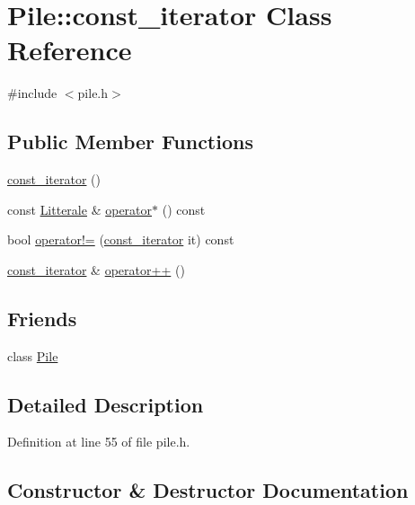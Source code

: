 \hypertarget{class_pile_1_1const__iterator}{}\section{Pile\+:\+:const\+\_\+iterator Class Reference}
\label{class_pile_1_1const__iterator}


{\ttfamily \#include $<$pile.\+h$>$}

\subsection*{Public Member Functions}
\begin{DoxyCompactItemize}
\item 
\hyperlink{class_pile_1_1const__iterator_a16b6388cc10e68859a1084e9ce50dbd6}{const\+\_\+iterator} ()
\item 
const \hyperlink{class_litterale}{Litterale} \& \hyperlink{class_pile_1_1const__iterator_a303c80d541bb110c9dc0ae0f0f1308ae}{operator$\ast$} () const 
\item 
bool \hyperlink{class_pile_1_1const__iterator_a0f202ce83d9776e19b84464b24d6d5f8}{operator!=} (\hyperlink{class_pile_1_1const__iterator}{const\+\_\+iterator} it) const 
\item 
\hyperlink{class_pile_1_1const__iterator}{const\+\_\+iterator} \& \hyperlink{class_pile_1_1const__iterator_a1aeccfde6065931eea320fa22f71eb01}{operator++} ()
\end{DoxyCompactItemize}
\subsection*{Friends}
\begin{DoxyCompactItemize}
\item 
class \hyperlink{class_pile_1_1const__iterator_a77806361379cf369e95d2b4346c7e28a}{Pile}
\end{DoxyCompactItemize}


\subsection{Detailed Description}


Definition at line 55 of file pile.\+h.



\subsection{Constructor \& Destructor Documentation}
